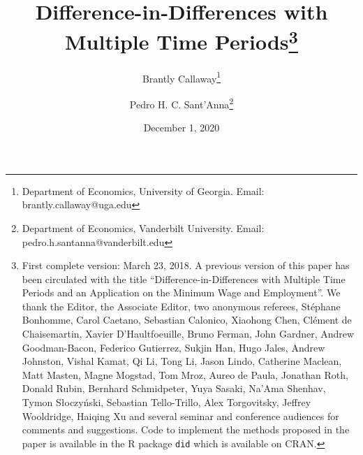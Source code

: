\documentclass[11pt]{article}%
\theoremstyle{plain}
\numberwithin{sassumption}{section}
\numberwithin{equation}{section}
\begin{document}
\title{Difference-in-Differences with Multiple Time Periods\thanks{First complete
version: March 23, 2018. A previous version of this paper has been circulated
with the title ``Difference-in-Differences with Multiple Time Periods and an
Application on the Minimum Wage and Employment''. We thank the Editor, the
Associate Editor, two anonymous referees, St\'{e}phane Bonhomme, Carol Caetano, Sebastian
Calonico, Xiaohong Chen, Cl\'{e}ment de Chaisemartin, Xavier D'Haultfoeuille,
Bruno Ferman, John Gardner, Andrew Goodman-Bacon, Federico Gutierrez, Sukjin Han, Hugo
Jales, Andrew Johnston, Vishal Kamat, Qi Li, Tong Li, Jason Lindo, Catherine Maclean, Matt Masten, Magne Mogstad, Tom Mroz, Aureo de
Paula, Jonathan Roth, Donald Rubin, Bernhard Schmidpeter, Yuya Sasaki, Na'Ama
Shenhav, Tymon S{\l }oczy\'{n}ski, Sebastian Tello-Trillo, Alex Torgovitsky,
Jeffrey Wooldridge, Haiqing Xu and several seminar and conference audiences
for comments and suggestions. Code to implement the methods proposed in the
paper is available in the R package \texttt{did} which is available on CRAN.}}
\author{Brantly Callaway\thanks{Department of Economics, University of Georgia. Email:
brantly.callaway@uga.edu}
\and Pedro H. C. Sant'Anna\thanks{Department of Economics, Vanderbilt University.
Email: pedro.h.santanna@vanderbilt.edu}}
\date{December 1, 2020}
\maketitle
\end{document}
